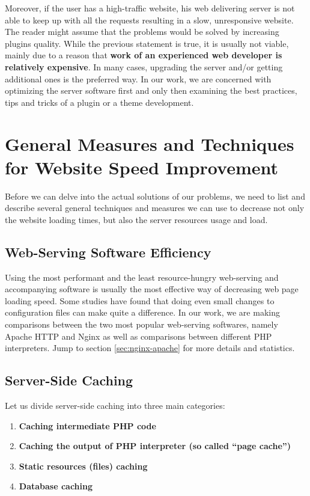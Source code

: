 Moreover, if the user has a high-traffic website, his web delivering server is not able to keep up with all the requests resulting in a slow, unresponsive website. The reader might assume that the problems would be solved by increasing plugins quality. While the previous statement is true, it is usually not viable, mainly due to a reason that \textbf{work of an experienced web developer is relatively expensive}. In many cases, upgrading the server and/or getting additional ones is the preferred way. In our work, we are concerned with optimizing the server software first and only then examining the best practices, tips and tricks of a plugin or a theme development.

\section{General Measures and Techniques for Website Speed Improvement}

Before we can delve into the actual solutions of our problems, we need to list and describe several general techniques and measures we can use to decrease not only the website loading times, but also the server resources usage and load.

\subsection{Web-Serving Software Efficiency}

Using the most performant and the least resource-hungry web-serving and accompanying software  is usually the most effective way of decreasing web page loading speed. Some studies have found that doing even small changes to configuration files can make quite a difference. In our work, we are making comparisons between the two most popular web-serving softwares, namely Apache HTTP and Nginx as well as comparisons between different PHP interpreters. Jump to section \ref{sec:nginx-apache} for more details and statistics. 

\subsection{Server-Side Caching}

Let us divide server-side \gls{caching} into three main categories:

\begin{enumerate}
    \item\textbf{Caching intermediate PHP code}
    \item\textbf{Caching the output of PHP interpreter (so called “page cache”)}
    \item\textbf{Static resources (files) caching}
    \item\textbf{Database caching}
  \end{enumerate}

